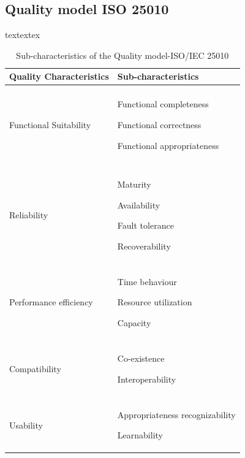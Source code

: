 \subsection{Quality model ISO 25010 }


textextex

\begin{table}[h!]
    \caption{Sub-characteristics of the Quality model-ISO/IEC 25010}
	\begin{tabularx}{\textwidth}{X | X }
	    \textbf{Quality Characteristics} & \textbf{Sub-characteristics}	
	    \\ \hline
		\\ %
		Functional Suitability
       
        & Functional completeness
        
        Functional correctness
        
        Functional appropriateness		
        
        \\ %
		\\ \hline
	     \\ %
		Reliability    
        
        &  Maturity 
        
        Availability
        
        Fault tolerance
        
        Recoverability
        
		\\ \hline
	     \\ %
	    Performance efficiency       
        
        & Time behaviour
        
        Resource utilization
        
        Capacity
        
        
	    \\ \hline
	  \\ %
	   Compatibility  
       
       &  Co-existence
       
       Interoperability   
       
     
	    \\ \hline
	    \\ %
	    
	   Usability	
       
       & Appropriateness recognizability
       
       Learnability
       

\end{tabularx}
\end{table}
